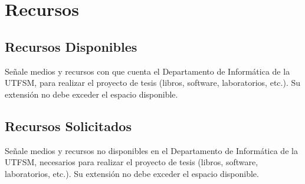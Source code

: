\documentclass[12pt,spanish]{article}
\begin{document}
\newpage
\section[]{Recursos}
\subsection{Recursos Disponibles}
Señale medios y recursos con que cuenta el Departamento de Informática
de la UTFSM, para realizar el proyecto de tesis (libros, software,
laboratorios, etc.). Su extensión no debe exceder el espacio
disponible.

\begin{boxedminipage}{\textwidth}
\hspace{20mm}
\vspace{50 mm} %
\end{boxedminipage}

\subsection{Recursos Solicitados}
Señale medios y recursos no disponibles en el Departamento de
Informática de la UTFSM, necesarios para realizar el proyecto de tesis
(libros, software, laboratorios, etc.). Su extensión no debe exceder
el espacio disponible.

\begin{boxedminipage}{\textwidth}
\hspace{20mm}
\vspace{50 mm} %
\end{boxedminipage}
\end{document}
